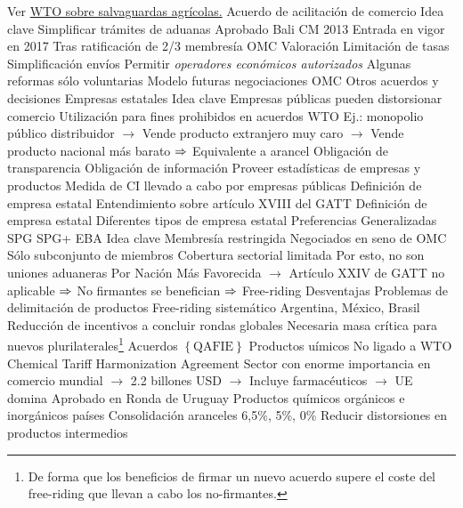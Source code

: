 \documentclass{nuevotema}
\begin{document}
\begin{esquemal}
				\4 Ver \href{https://www.wto.org/english/tratop_e/agric_e/negs_bkgrnd11_ssg_e.htm}{WTO sobre salvaguardas agrícolas.}
		\2 Acuerdo de acilitación de comercio
			\3 Idea clave
				\4 Simplificar trámites de aduanas
				\4 Aprobado Bali CM 2013
				\4 Entrada en vigor en 2017
				\4[] Tras ratificación de 2/3 membresía OMC
			\3 Valoración
				\4 Limitación de tasas
				\4 Simplificación envíos
				\4 Permitir \textit{operadores económicos autorizados}
				\4 Algunas reformas sólo voluntarias
				\4 Modelo futuras negociaciones OMC
		\2 Otros acuerdos y decisiones
			\3 Empresas estatales
				\4 Idea clave
				\4[] Empresas públicas pueden distorsionar comercio
				\4[] Utilización para fines prohibidos en acuerdos WTO
				\4[] Ej.: monopolio público distribuidor
				\4[] $\to$ Vende producto extranjero muy caro
				\4[] $\to$ Vende producto nacional más barato
				\4[] $\Rightarrow$ Equivalente a arancel
				\4[] Obligación de transparencia
				\4 Obligación de información
				\4[] Proveer estadísticas de empresas y productos
				\4[] Medida de CI llevado a cabo por empresas públicas
				\4 Definición de empresa estatal
				\4[] Entendimiento sobre artículo XVIII del GATT
				\4[] Definición de empresa estatal
				\4[] Diferentes tipos de empresa estatal
			\3 Preferencias Generalizadas
				\4 SPG
				\4 SPG+
				\4 EBA
	\1 
		\2 Idea clave
			\3 Membresía restringida
				\4 Negociados en seno de OMC
				\4 Sólo subconjunto de miembros
			\3 Cobertura sectorial limitada
				\4 Por esto, no son uniones aduaneras
				\4[] Por Nación Más Favorecida
				\4[] $\to$ Artículo XXIV de GATT no aplicable
				\4[] $\Rightarrow$ No firmantes se benefician
				\4[] $\Rightarrow$ Free-riding
			\3 Desventajas
				\4 Problemas de delimitación de productos
				\4 Free-riding sistemático
				\4[] Argentina, México, Brasil
				\4 Reducción de incentivos a concluir rondas globales
				\4[$\to$] Necesaria masa crítica para nuevos plurilaterales\footnote{De forma que los beneficios de firmar un nuevo acuerdo supere el coste del free-riding que llevan a cabo los no-firmantes.}
		\2 Acuerdos $\left\lbrace \text{QAFIE} \right\rbrace$
			\3 Productos uímicos
				\4 No ligado a WTO
				\4 Chemical Tariff Harmonization Agreement
				\4 Sector con enorme importancia en comercio mundial
				\4[] $\to$ 2.2 billones USD
				\4[] $\to$ Incluye farmacéuticos
				\4[] $\to$ UE domina
				\4 Aprobado en Ronda de Uruguay
				\4 Productos químicos orgánicos e inorgánicos
				 países
				\4 Consolidación aranceles 6,5\%, 5\%, 0\%
				\4 Reducir distorsiones en productos intermedios

\end{esquemal}
\end{document}
